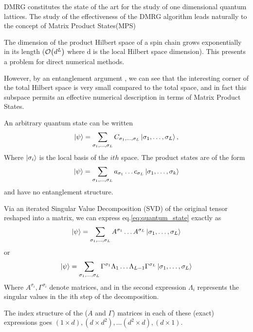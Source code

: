 \documentclass[final]{beamer}
\begin{document}
\begin{frame}[t]
\begin{multicols}{3}
DMRG constitutes the state of the art for the study of one dimensional quantum lattices.  
The study of the effectiveness of the DMRG algorithm leads naturally to the concept of Matrix Product States(MPS)

The dimension of the product Hilbert space of a spin chain grows exponentially in its length ($\order{d^L}$ where d is the local Hilbert space dimension).
This presents a problem for direct numerical methods. 

However, by an entanglement argument \cite{Orus2014}, we can see that the interesting corner of the total Hilbert space is very small compared to the total space, and in fact this subspace permits an effective numerical description in terms of Matrix Product States.

An arbitrary quantum state can be written
\begin{equation}
    \ket{\psi} = \sum_{\sigma_1, \ldots, \sigma_L} C_{\sigma_1, \ldots, \sigma_L} \ket{\sigma_1, \ldots, \sigma_L},\label{eq:quantum_state}
\end{equation}
Where $\ket{\sigma_i}$ is the local basis of the $ith$ space.
The product states are of the form 
\begin{equation}
    \ket{\psi} = \sum_{\sigma_1, \ldots, \sigma_L} a_{\sigma_1} \ldots c_{\sigma_L} \ket{\sigma_1, \ldots, \sigma_k}
\end{equation}
and have no entanglement structure. 

Via an iterated Singular Value Decomposition (SVD) of the original tensor reshaped into a matrix, we can express eq.\ref{eq:quantum_state} exactly as
\begin{equation}
    \ket{\psi} = \sum_{\sigma_1, \ldots, \sigma_L} A^{\sigma_1} \ldots A^{\sigma_L} \ket{\sigma_1, \ldots, \sigma_L }\label{eq:schollwock_mps}
\end{equation}
or
\begin{equation}
    \ket{\psi} = \sum_{\sigma_1, \ldots, \sigma_L} \Gamma^{\sigma_1}\Lambda_1 \ldots \Lambda_{L-1}\Gamma^{\sigma_L} \ket{\sigma_1, \ldots, \sigma_L }\label{eq:orus_mps}
\end{equation}
Where $A^{\sigma_i}, \Gamma^{\sigma_i}$ denote matrices, and in the second expression $\Lambda_i$ represents the singular values in the ith step of the decomposition.

The index structure of the ($A$ and $\Gamma$) matrices in each of these (exact) expressions goes $(1\times d), (d \times d^2), \ldots (d^2 \times d), (d\times 1)$.


\end{multicols}
\end{frame}
\end{document}
